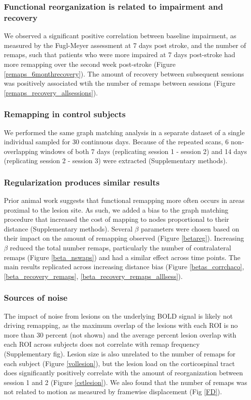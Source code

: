 \documentclass[10pt]{article}
\begin{document}
	\subsubsection*{Functional reorganization is related to impairment and recovery}
	We observed a significant positive correlation between baseline impairment, as measured by the Fugl-Meyer assessment at 7 days post stroke, and the number of remaps, such that patients who were more impaired at 7 days post-stroke had more remapping over the second week post-stroke (Figure \ref{remaps_6monthrecovery}). The amount of recovery between subsequent sessions was positively associated wtih the number of remaps between sessions (Figure \ref{remaps_recovery_allsessions}).
	
	\subsubsection*{Remapping in control subjects}
	We performed the same graph matching analysis in a separate dataset of a single individual sampled for 30 continuous days. Because of the repeated scans, 6 non-overlapping windows of both 7 days (replicating session 1 - session 2) and 14 days (replicating session 2 - session 3) were extracted (Supplementary methods). 
	
	\subsubsection*{Regularization produces similar results}
	Prior animal work suggests that functional remapping more often occurs in areas proximal to the lesion site. As such, we added a bias to the graph matching procedure that increased the cost of mapping to nodes proportional to their distance (Supplementary methods). Several $\beta$ parameters were chosen based on their impact on the amount of remapping observed (Figure \ref{betareg}). Increasing $\beta$ reduced the total number remaps, particularly the number of contralateral remaps (Figure \ref{beta_nswaps}) and had a similar effect across time points. The main results replicated across increasing distance bias (Figure \ref{betas_corrchaco}, \ref{beta_recovery_remaps}, \ref{beta_recovery_remaps_alllsess}).
			
	\subsubsection*{Sources of noise}
	The impact of noise from lesions on the underlying BOLD signal is likely not driving remapping, as the maximum overlap of the lesions with each ROI is no more than 30 percent (not shown) and the average percent lesion overlap with each ROI across subjects does not correlate with remap frequency (Supplementary fig). Lesion size is also unrelated to the number of remaps for each subject (Figure \ref{vollesion}), but the lesion load on the corticospinal tract  does significantly positively correlate with the amount of reorganization between session 1 and 2 (Figure \ref{cstlesion}). We also found that the number of remaps was not related to motion as measured by framewise displacement (Fig \ref{FD}).
	
\end{document}
